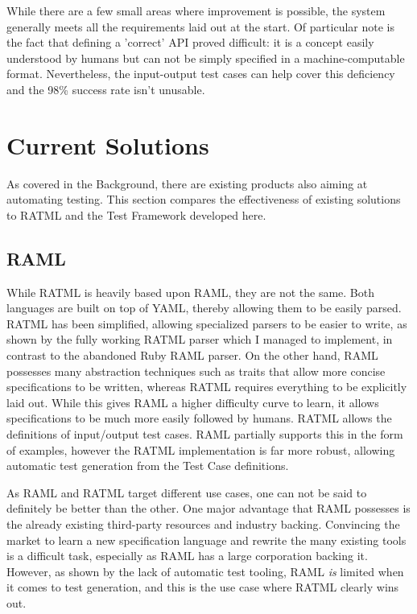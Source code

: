 While there are a few small areas where improvement is possible, the system generally meets all the requirements laid out at the start. Of particular note is the fact that defining a 'correct' API proved difficult: it is a concept easily understood by humans but can not be simply specified in a machine-computable format. Nevertheless, the input-output test cases can help cover this deficiency and the 98\% success rate isn't unusable.

\section{Current Solutions}

As covered in the Background, there are existing products also aiming at automating testing. This section compares the effectiveness of existing solutions to RATML and the Test Framework developed here.

\subsection{RAML}

While RATML is heavily based upon RAML, they are not the same. Both languages are built on top of YAML, thereby allowing them to be easily parsed. RATML has been simplified, allowing specialized parsers to be easier to write, as shown by the fully working RATML parser which I managed to implement, in contrast to the abandoned Ruby RAML parser. On the other hand, RAML possesses many abstraction techniques such as traits that allow more concise specifications to be written, whereas RATML requires everything to be explicitly laid out. While this gives RAML a higher difficulty curve to learn, it allows specifications to be much more easily followed by humans. RATML allows the definitions of input/output test cases. RAML partially supports this in the form of examples, however the RATML implementation is far more robust, allowing automatic test generation from the Test Case definitions.

As RAML and RATML target different use cases, one can not be said to definitely be better than the other. One major advantage that RAML possesses is the already existing third-party resources and industry backing. Convincing the market to learn a new specification language and rewrite the many existing tools is a difficult task, especially as RAML has a large corporation backing it. However, as shown by the lack of automatic test tooling, RAML \emph{is} limited when it comes to test generation, and this is the use case where RATML clearly wins out.

